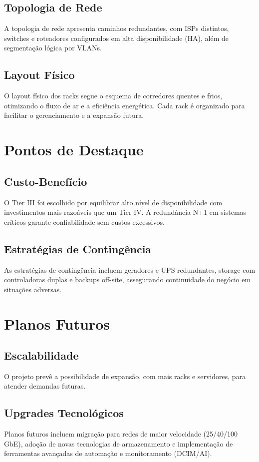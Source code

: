 \documentclass[
	12pt,				%
	oneside,			%
	a4paper,			%
	english,			%
	brazil				%
	]{abntex2unama}
\begin{document}
\subsection{Topologia de Rede}
A topologia de rede apresenta caminhos redundantes, com ISPs distintos, switches e roteadores configurados em alta disponibilidade (HA), além de segmentação lógica por VLANs.

\subsection{Layout Físico}
O layout físico dos racks segue o esquema de corredores quentes e frios, otimizando o fluxo de ar e a eficiência energética. Cada rack é organizado para facilitar o gerenciamento e a expansão futura.

\section{Pontos de Destaque}
\subsection{Custo-Benefício}
O Tier III foi escolhido por equilibrar alto nível de disponibilidade com investimentos mais razoáveis que um Tier IV. A redundância N+1 em sistemas críticos garante confiabilidade sem custos excessivos.

\subsection{Estratégias de Contingência}
As estratégias de contingência incluem geradores e UPS redundantes, storage com controladoras duplas e backups off-site, assegurando continuidade do negócio em situações adversas.

\section{Planos Futuros}
\subsection{Escalabilidade}
O projeto prevê a possibilidade de expansão, com mais racks e servidores, para atender demandas futuras.

\subsection{Upgrades Tecnológicos}
Planos futuros incluem migração para redes de maior velocidade (25/40/100 GbE), adoção de novas tecnologias de armazenamento e implementação de ferramentas avançadas de automação e monitoramento (DCIM/AI).
\end{document}
